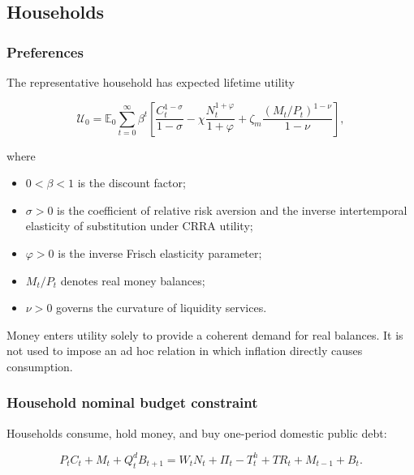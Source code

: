 \subsection{Households}
\label{app:households}

\subsubsection{Preferences}

The representative household has expected lifetime utility

\begin{equation}
\mathcal U_0
=
\mathbb E_0
\sum_{t=0}^{\infty}
\beta^t
\left[
\frac{C_t^{1-\sigma}}{1-\sigma}
-
\chi\frac{N_t^{1+\varphi}}{1+\varphi}
+
\zeta_m\frac{(M_t/P_t)^{1-\nu}}{1-\nu}
\right],
\label{eq:utility_level}
\end{equation}

where

\begin{itemize}
    \item \(0<\beta<1\) is the discount factor;
    \item \(\sigma>0\) is the coefficient of relative risk aversion and the
    inverse intertemporal elasticity of substitution under CRRA utility;
    \item \(\varphi>0\) is the inverse Frisch elasticity parameter;
    \item \(M_t/P_t\) denotes real money balances;
    \item \(\nu>0\) governs the curvature of liquidity services.
\end{itemize}

Money enters utility solely to provide a coherent demand for real balances.
It is not used to impose an ad hoc relation in which inflation directly causes
consumption.

\subsubsection{Household nominal budget constraint}

Households consume, hold money, and buy one-period domestic public debt:

\begin{equation}
P_tC_t+M_t+Q_t^dB_{t+1}
=
W_tN_t+\Pi_t-T_t^h+TR_t+M_{t-1}+B_t.
\label{eq:hh_budget_level}
\end{equation}

